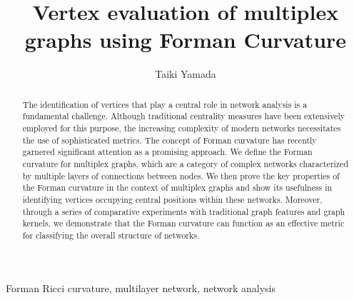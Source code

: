 \documentclass[preprint,12pt,number]{elsarticle}
\theoremstyle{plain} %
\theoremstyle{definition} %
\begin{document}
\begin{frontmatter}
\title{Vertex evaluation of multiplex graphs using Forman Curvature} %

\author{Taiki Yamada} %


\begin{abstract}
The identification of vertices that play a central role in network analysis is a fundamental challenge. Although traditional centrality measures have been extensively employed for this purpose, the increasing complexity of modern networks necessitates the use of sophisticated metrics. The concept of Forman curvature has recently garnered significant attention as a promising approach. We define the Forman curvature for multiplex graphs, which are a category of complex networks characterized by multiple layers of connections between nodes. We then prove the key properties of the Forman curvature in the context of multiplex graphs and show its usefulness in identifying vertices occupying central positions within these networks. Moreover, through a series of comparative experiments with traditional graph features and graph kernels, we demonstrate that the Forman curvature can function as an effective metric for classifying the overall structure of networks.
\end{abstract}



\begin{keyword}


Forman Ricci curvature, multilayer network, network analysis
\end{keyword}

\end{frontmatter}
\end{document}
